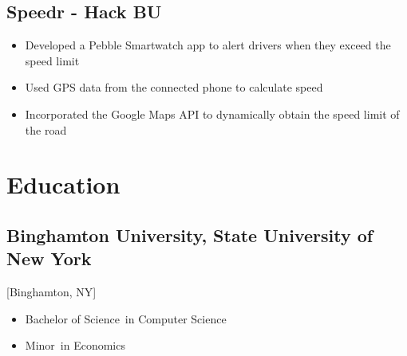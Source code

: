 \documentclass{mycv}
\begin{document}
\subsection{Speedr - Hack BU}
\begin{itemize}
  \item Developed a Pebble Smartwatch app to alert drivers when they exceed the speed limit
  \item Used GPS data from the connected phone to calculate speed
  \item Incorporated the Google Maps API to dynamically obtain the speed limit of the road   

\end{itemize}

\section{Education}

\subsection{Binghamton University, State University of New York}[Binghamton, NY]
\vspace{-\parskip}%
\begin{itemize}[label={}]
  \item Bachelor of Science\ in Computer Science 
  \item Minor\ in Economics
\end{itemize}
\end{document}

